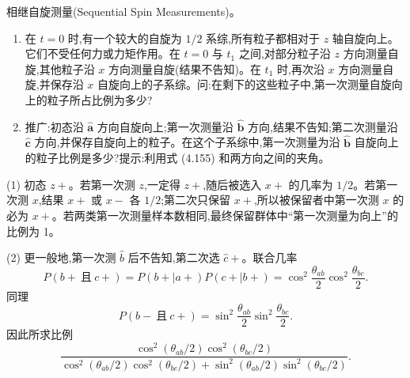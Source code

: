 \begin{question}
相继自旋测量(Sequential Spin Measurements)。
\begin{enumerate}
\item 在 $t=0$ 时,有一个较大的自旋为 $1/2$ 系综,所有粒子都相对于 $z$ 轴自旋向上。它们不受任何力或力矩作用。在 $t=0$ 与 $t_1$ 之间,对部分粒子沿 $z$ 方向测量自旋,其他粒子沿 $x$ 方向测量自旋(结果不告知)。在 $t_1$ 时,再次沿 $x$ 方向测量自旋,并保存沿 $x$ 自旋向上的子系综。问:在剩下的这些粒子中,第一次测量自旋向上的粒子所占比例为多少?
\item 推广:初态沿 $\hat{\mathbf a}$ 方向自旋向上;第一次测量沿 $\hat{\mathbf b}$ 方向,结果不告知;第二次测量沿 $\hat{\mathbf c}$ 方向,并保存自旋向上的粒子。在这个子系综中,第一次测量为沿 $\hat{\mathbf b}$ 自旋向上的粒子比例是多少?提示:利用式 (4.155) 和两方向之间的夹角。
\end{enumerate}

\par\smallskip
{}

\begin{solution}

(1) 初态 $z+$。若第一次测 $z$,一定得 $z+$,随后被选入 $x+$ 的几率为 $1/2$。若第一次测 $x$,结果 $x+$ 或 $x-$ 各 $1/2$;第二次只保留 $x+$,所以被保留者中第一次测 $x$ 的必为 $x+$。若两类第一次测量样本数相同,最终保留群体中“第一次测量为向上”的比例为 1。

(2) 更一般地,第一次测 $\hat b$ 后不告知,第二次选 $\hat c+$。联合几率
\[
P(b+\ \text{且}\ c+)=P(b+|a+)P(c+|b+)
=\cos^2\frac{\theta_{ab}}2\cos^2\frac{\theta_{bc}}2.
\]
同理
\[
P(b-\ \text{且}\ c+)=\sin^2\frac{\theta_{ab}}2\sin^2\frac{\theta_{bc}}2.
\]
因此所求比例
\[
\frac{\cos^2(\theta_{ab}/2)\cos^2(\theta_{bc}/2)}{\cos^2(\theta_{ab}/2)\cos^2(\theta_{bc}/2)+\sin^2(\theta_{ab}/2)\sin^2(\theta_{bc}/2)}.
\]

\end{solution}
\end{question}

